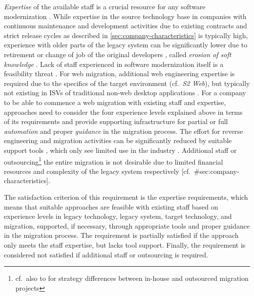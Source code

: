 \emph{Expertise} of the available staff is a crucial resource for any software modernization \autocite{Khadka2014ProfessionalsModernization,Batlajery2014IndustrialSurveyModernization,Sneed2010SoftwareMigration,Seacord2003ModernizingLS}.
While expertise in the source technology base in companies with continuous maintenance and development activities due to existing contracts and strict release cycles as described in \cref{sec:company-characteristics} is typically high, experience with older parts of the legacy system can be significantly lower due to retirement or change of job of the original developers \autocite{Khadka2016PHD,Batlajery2014IndustrialSurveyModernization,Khadka2014ProfessionalsModernization}, called \emph{erosion of soft knowledge} \autocite{Khadka2014ProfessionalsModernization}.
Lack of staff experienced in software modernization itself is a feasibility threat \autocite{Sneed2010SoftwareMigration,Seacord2003ModernizingLS}.
For web migration, additional web engineering expertise is required due to the specifics of the target environment (cf.~\emph{S2 Web}), but typically not existing in ISVs of traditional non-web desktop applications \autocite{Fowley2017CloudSME}.
For a company to be able to commence a web migration with existing staff and expertise, approaches need to consider the four experience levels explained above in terms of its requirements and provide supporting infrastructure for partial or full \emph{automation} and proper \emph{guidance} in the migration process.
The effort for reverse engineering and migration activities can be significantly reduced by suitable support tools \autocite{Lucia2009METAMORPHOS}, which only see limited use in the industry \autocite{Torchiano2008ItalianSurvey}.
Additional staff or outsourcing\footnote{cf.~also to \autocite{Razavian2012} for strategy differences between in-house and outsourced migration projects} the entire migration is not desirable due to limited financial resources and complexity of the legacy system respectively {[}cf.~\#sec:company-characteristics{]}.

The satisfaction criterion of this requirement is the expertise requirements, which means that suitable approaches are feasible with existing staff based on experience levels in legacy technology, legacy system, target technology, and migration, supported, if necessary, through appropriate tools and proper guidance in the migration process.
The requirement is partially satisfied if the approach only meets the staff expertise, but lacks tool support.
Finally, the requirement is considered not satisfied if additional staff or outsourcing is required.

